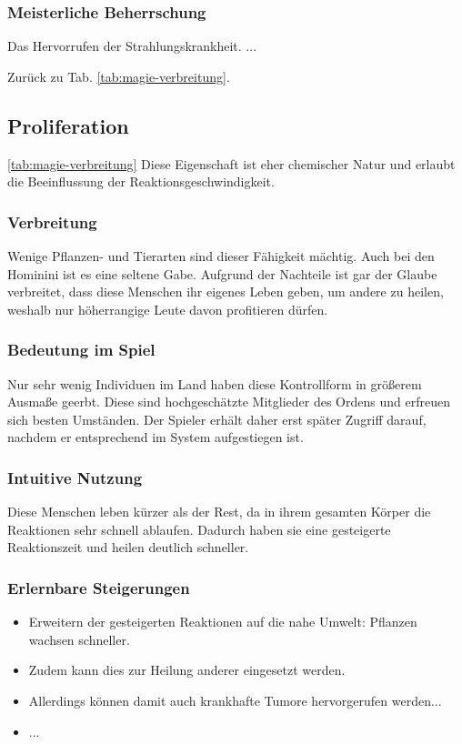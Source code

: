 \subsubsection{Meisterliche Beherrschung} 
\begin{outline}
	\1 Das Hervorrufen der Strahlungskrankheit.
	\1 ...
\end{outline}
Zurück zu Tab. \ref{tab:magie-verbreitung}.



\subsection{Proliferation}\label{sec:proliferationsmagie} \ref{tab:magie-verbreitung} %
Diese Eigenschaft ist eher chemischer Natur und erlaubt die Beeinflussung der Reaktionsgeschwindigkeit.

\subsubsection{Verbreitung}
Wenige Pflanzen- und Tierarten sind dieser Fähigkeit mächtig. Auch bei den Hominini ist es eine seltene Gabe. Aufgrund der Nachteile ist gar der Glaube verbreitet, dass diese Menschen ihr eigenes Leben geben, um andere zu heilen, weshalb nur höherrangige Leute davon profitieren dürfen.

\subsubsection{Bedeutung im Spiel}
Nur sehr wenig Individuen im Land haben diese Kontrollform in größerem Ausmaße geerbt. Diese sind hochgeschätzte Mitglieder des Ordens und erfreuen sich besten Umständen. Der Spieler erhält daher erst später Zugriff darauf, nachdem er entsprechend im System aufgestiegen ist.

\subsubsection{Intuitive Nutzung}
Diese Menschen leben kürzer als der Rest, da in ihrem gesamten Körper die Reaktionen sehr schnell ablaufen. Dadurch haben sie eine gesteigerte Reaktionszeit und heilen deutlich schneller.

\subsubsection{Erlernbare Steigerungen}
\begin{itemize}
	\item Erweitern der gesteigerten Reaktionen auf die nahe Umwelt: Pflanzen wachsen schneller.
	\item Zudem kann dies zur Heilung anderer eingesetzt werden.
	\item Allerdings können damit auch krankhafte Tumore hervorgerufen werden... 
	\item ...
\end{itemize}

